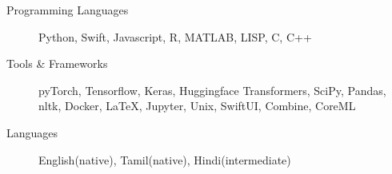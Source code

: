 \begin{description}
\item[Programming Languages] Python, Swift, Javascript, R, MATLAB, LISP, C, C++

\item[Tools \& Frameworks] pyTorch, Tensorflow, Keras, Huggingface Transformers, SciPy, Pandas, nltk, Docker, \LaTeX, Jupyter, Unix, SwiftUI, Combine, CoreML

\item[Languages] English(native), Tamil(native), Hindi(intermediate)
\end{description}
